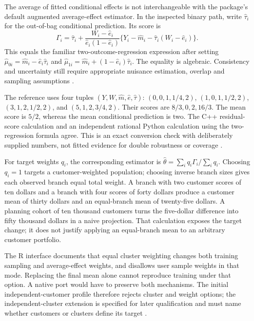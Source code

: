 The average of fitted conditional effects is not interchangeable with
the package's default augmented average-effect estimator. In the
inspected binary path, write \(\widehat\tau_i\) for the out-of-bag
conditional prediction. Its score is \[
 \Gamma_i=\widehat\tau_i+
 \frac{W_i-\widehat e_i}{\widehat e_i(1-\widehat e_i)}
 \{Y_i-\widehat m_i-\widehat\tau_i(W_i-\widehat e_i)\}.
\] This equals the familiar two-outcome-regression expression after
setting \(\widehat\mu_{0i}=\widehat m_i-\widehat e_i\widehat\tau_i\) and
\(\widehat\mu_{1i}=\widehat m_i+(1-\widehat e_i)\widehat\tau_i\). The
equality is algebraic. Consistency and uncertainty still require
appropriate nuisance estimation, overlap and sampling assumptions
\citep{exec13_grf_rpath}.

The reference uses four tuples
\((Y,W,\widehat m,\widehat e,\widehat\tau)\): \((0,0,1,1/4,2)\),
\((1,0,1,1/2,2)\), \((3,1,2,1/2,2)\), and \((5,1,2,3/4,2)\). Their
scores are \(8/3,0,2,16/3\). The mean score is \(5/2\), whereas the mean
conditional prediction is two. The C++ residual-score calculation and an
independent rational Python calculation using the two-regression formula
agree. This is an exact conversion check with deliberately supplied
numbers, not fitted evidence for double robustness or coverage
\citep{exec13_grf_oracle}.

For target weights \(q_i\), the corresponding estimator is
\(\widehat\theta=\sum_iq_i\Gamma_i/\sum_iq_i\). Choosing \(q_i=1\)
targets a customer-weighted population; choosing inverse branch sizes
gives each observed branch equal total weight. A branch with two
customer scores of ten dollars and a branch with four scores of forty
dollars produce a customer mean of thirty dollars and an equal-branch
mean of twenty-five dollars. A planning cohort of ten thousand customers
turns the five-dollar difference into fifty thousand dollars in a naive
projection. That calculation exposes the target change; it does not
justify applying an equal-branch mean to an arbitrary customer
portfolio.

The R interface documents that equal cluster weighting changes both
training sampling and average-effect weights, and disallows user sample
weights in that mode. Replacing the final mean alone cannot reproduce
training under that option. A native port would have to preserve both
mechanisms. The initial independent-customer profile therefore rejects
cluster and weight options; the independent-cluster extension is
specified for later qualification and must name whether customers or
clusters define its target \citep{exec13_grf_rpath}.


